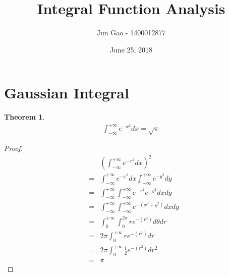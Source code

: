 \documentclass[12pt]{article}
\newtheorem{theorem}{Theorem}[section]
\begin{document}
 
\title{Integral Function Analysis}
\author{Jun Gao - 1400012877}
\date{June 25, 2018}

\maketitle
\section{Gaussian Integral}
\begin{theorem}
	\begin{eqnarray}
	\int_{-\infty}^{+\infty} e^{-x^2} dx = \sqrt{\pi}
	\end{eqnarray}
\end{theorem}
\begin{proof}
\begin{eqnarray*}
	&&\left(\int_{-\infty}^{+\infty} e^{-x^2} dx\right)^2\\
	&=&\int_{-\infty}^{+\infty} e^{-x^2} dx \int_{-\infty}^{+\infty} e^{-y^2} dy\\
	&=& \int_{-\infty}^{+\infty}\int_{-\infty}^{+\infty} e^{-x^2} e^{-y^2} dxdy\\
	&=&\int_{-\infty}^{+\infty}\int_{-\infty}^{+\infty} e^{-(x^2+y^2)}dxdy\\
	&=&\int_{0}^{+\infty}\int_{0}^{2\pi} re^{-(r^2)}d\theta dr\\
	&=&2\pi \int_{0}^{+\infty}re^{-(r^2)} dr\\
	&=&2\pi \int_{0}^{+\infty}\frac{1}{2}e^{-(r^2)} dr^2\\
	&=&\pi
\end{eqnarray*}
\end{proof}
\end{document}
